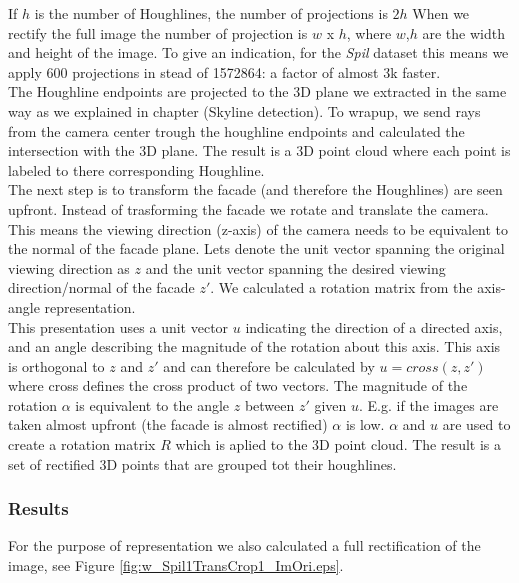 If $h$ is the number of Houghlines, the number of projections is $2h$
When we rectify the full image the number of projection is $w$ x $h$, where $w$,$h$ are the width and height of
the image. To give an indication, for the \emph{Spil} dataset %
this means we apply 600 projections in stead of 1572864: a factor of almost 3k faster.\\


The Houghline endpoints are projected to the 3D plane we extracted in the same
way as we explained in chapter %
(Skyline detection). To wrapup, we send
rays from the camera center trough the houghline endpoints and calculated the
intersection with the 3D plane.  The result is a 3D point cloud where each
point is labeled to there corresponding Houghline.\\

The next step is to transform the facade (and therefore the Houghlines) are
seen upfront. Instead of trasforming the facade we rotate and translate the camera. 
This means the viewing direction (z-axis) of the camera needs
to be equivalent to the normal of the facade plane. Lets denote the
unit vector spanning the original viewing direction as $z$ and the
unit vector spanning the desired viewing direction/normal of the facade $z'$.
We calculated a rotation matrix from the axis-angle representation.\\

This presentation uses a unit vector $u$ indicating the direction of a directed axis, and an
angle describing the magnitude of the rotation about this axis.
This axis is orthogonal to $z$ and $z'$ and can therefore be
calculated by $u = cross(z,z')$ where cross defines the cross product of
two vectors.
The magnitude of the rotation $\alpha$ is equivalent to the angle $z$ between $z'$ given $u$. 
E.g. if the images are taken almost upfront (the facade is almost rectified) $\alpha$ is low.
$\alpha$ and $u$ are used to create a rotation matrix $R$ which is aplied to the 3D point cloud.
The result is a set of rectified 3D points that are grouped tot their houghlines.

\subsubsection{Results}
For the purpose of representation we also calculated a full rectification
of the image, see Figure \ref{fig:w_Spil1TransCrop1_ImOri.eps}.


